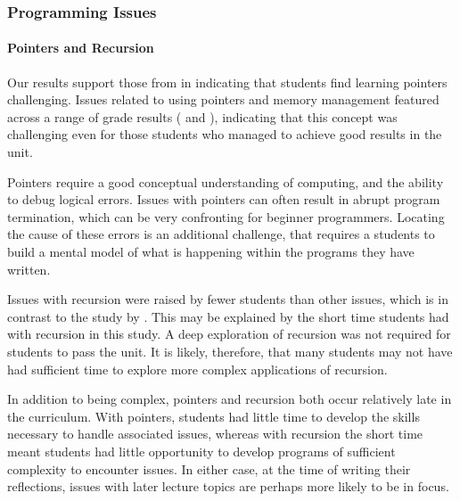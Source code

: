 
\subsubsection{Programming Issues}

\paragraph{Pointers and Recursion} %
\label{ssub:pointers_and_recursion}

Our results support those from \citet{Lahtinen:2005} in indicating that students find learning pointers challenging. Issues related to using pointers and memory management featured across a range of grade results ( and ), indicating that this concept was challenging even for those students who managed to achieve good results in the unit. 

Pointers require a good conceptual understanding of computing, and the ability to debug logical errors. Issues with pointers can often result in abrupt program termination, which can be very confronting for beginner programmers. Locating the cause of these errors is an additional challenge, that requires a students to build a mental model of what is happening within the programs they have written.

Issues with recursion were raised by fewer students than other issues, which is in contrast to the study by \citet{Lahtinen:2005}. This may be explained by the short time students had with recursion in this study. A deep exploration of recursion was not required for students to pass the unit. It is likely, therefore, that many students may not have had sufficient time to explore more complex applications of recursion.

In addition to being complex, pointers and recursion both occur relatively late in the curriculum. With pointers, students had little time to develop the skills necessary to handle associated issues, whereas with recursion the short time meant students had little opportunity to develop programs of sufficient complexity to encounter issues.  In either case, at the time of writing their reflections, issues with later lecture topics are perhaps more likely to be in focus.



